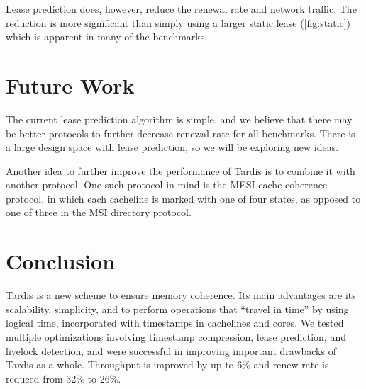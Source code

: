 \documentclass[12pt]{article}
\begin{document}
Lease prediction does, however, reduce the renewal rate and network 
traffic. The reduction is more significant than simply using a larger 
static lease (\cref{fig:static}) which is apparent in many of the 
benchmarks.

\section{Future Work}

The current lease prediction algorithm is simple, and we believe that 
there may be better protocols to further decrease renewal rate for all 
benchmarks. There is a large design space with lease prediction, so we 
will be exploring new ideas.

Another idea to further improve the performance of Tardis is to 
combine it with another protocol. One such protocol in mind is the 
MESI cache coherence protocol, in which each cacheline is marked with 
one of four states, as opposed to one of three in the MSI directory 
protocol.

\section{Conclusion}

Tardis is a new scheme to ensure memory coherence. Its main advantages 
are its scalability, simplicity, and to perform operations that 
``travel in time'' by using logical time, incorporated with timestamps 
in cachelines and cores. We tested multiple optimizations involving 
timestamp compression, lease prediction, and livelock detection, and 
were successful in improving important drawbacks of Tardis as a whole. Throughput is improved by up to 6\% and renew rate is reduced from 32\% to 26\%.

{
	
	
}
\end{document}
